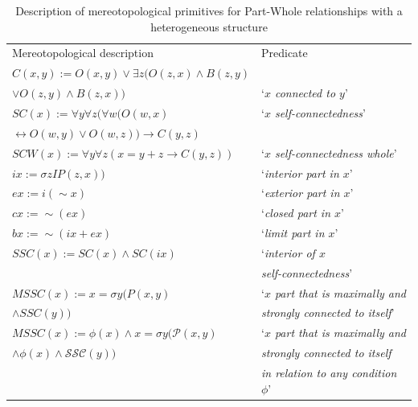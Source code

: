 \documentclass[runningheads,a4paper]{llncs}
\begin{document}
\begin{table}
\caption{Description of mereotopological primitives for Part-Whole relationships with a heterogeneous structure}
\label{tab:2}       %
\begin{tabular}{ll}
\hline\noalign{\smallskip}
Mereotopological description  & Predicate \\
\noalign{\smallskip}\hline\noalign{\smallskip}
${C}(x,y) :={O}(x,y)\vee\exists{z}({O}(z,x)\wedge{B}(z,y)$\\
$\vee{O}(z,y)\wedge{B}(z,x))$ & `\textit{$x$ connected to $y$}' \\
\noalign{\smallskip}\hline\noalign{\smallskip}
${SC}(x) := \forall{y}\forall{z}(\forall{w}({O}(w,x)$ & `\textit{$x$ self-connectedness}' \\
$\leftrightarrow {O}(w,y)\vee{O}(w,z))\rightarrow{C}(y,z)$ &\\
\noalign{\smallskip}\hline\noalign{\smallskip}
${SCW}(x) := \forall{y}\forall{z}(x=y+z\rightarrow{C}(y,z))$ & `\textit{$x$ self-connectedness whole}' \\
\noalign{\smallskip}\hline\noalign{\smallskip}
${ix} :=\sigma{z}{IP}(z,x))$ & `\textit{interior part in $x$}' \\
\noalign{\smallskip}\hline\noalign{\smallskip}
${ex} :={i}(\sim{x})$ & `\textit{exterior part in $x$}' \\
\noalign{\smallskip}\hline\noalign{\smallskip}
${cx} :=\sim ({ex})$ & `\textit{closed part in $x$}' \\
\noalign{\smallskip}\hline\noalign{\smallskip}
${bx} :=\sim ({ix}+{ex})$ & `\textit{limit part in $x$}' \\
\noalign{\smallskip}\hline\noalign{\smallskip}
${SSC}(x) :={SC}(x)\wedge{SC}(ix)$ & `\textit{interior of $x$} \\
 & \textit{self-connectedness}' \\
\noalign{\smallskip}\hline\noalign{\smallskip}
${MSSC}(x):=x=\sigma{y}({P}(x,y)$ & `\textit{$x$ part that is maximally and}\\
$\wedge{SSC}(y))$ & \textit{strongly connected to itself}' \\
\noalign{\smallskip}\hline\noalign{\smallskip}
${MSSC}(x) :=\phi{(x)}\wedge{x}=\sigma{y}({\mathcal{P}}(x,y)$ & `\textit{$x$ part that is maximally and} \\
$\wedge\phi{(x)}\wedge {\mathcal{SSC}}(y))$ & \textit{strongly connected to itself} \\
 & \textit{in relation to any condition $\phi$}' \\

\end{tabular}
\end{table}
\end{document}
